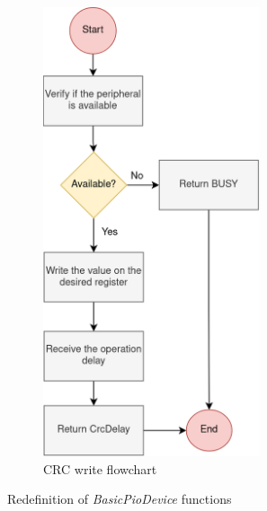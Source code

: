 \begin{figure}[t!]
\begin{subfigure}{0.4\textwidth}
		\includegraphics[width=0.7\textwidth]{Images/CrcWriteFunction.png}
		\caption[1\textwidth]{CRC write flowchart}
		\label{fig_CrcWriteFunction}
	\end{subfigure}
		
	\caption{Redefinition of \textit{BasicPioDevice} functions}
\end{figure}
 

